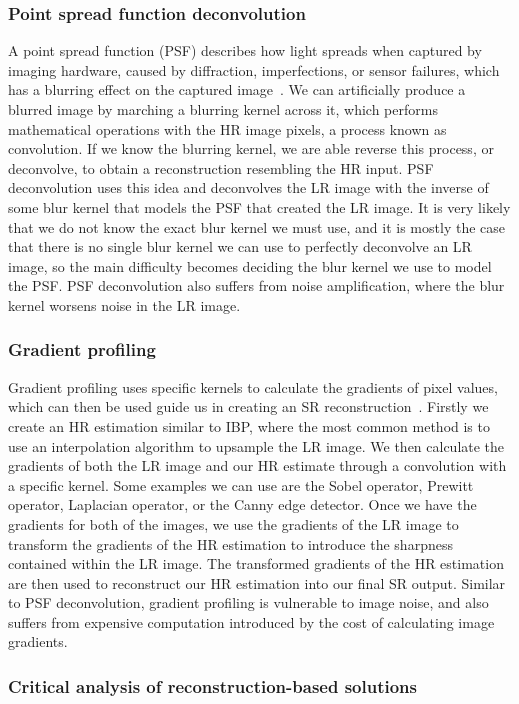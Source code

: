 \subsubsection{Point spread function deconvolution}
A point spread function (PSF) describes how light spreads when captured by imaging hardware, caused by diffraction, imperfections, or sensor failures, which has a blurring effect on the captured image~\cite{ref}. We can artificially produce a blurred image by marching a blurring kernel across it, which performs mathematical operations with the HR image pixels, a process known as convolution. If we know the blurring kernel, we are able reverse this process, or deconvolve, to obtain a reconstruction resembling the HR input. PSF deconvolution uses this idea and deconvolves the LR image with the inverse of some blur kernel that models the PSF that created the LR image. It is very likely that we do not know the exact blur kernel we must use, and it is mostly the case that there is no single blur kernel we can use to perfectly deconvolve an LR image, so the main difficulty becomes deciding the blur kernel we use to model the PSF. PSF deconvolution also suffers from noise amplification, where the blur kernel worsens noise in the LR image.

\subsubsection{Gradient profiling}
Gradient profiling uses specific kernels to calculate the gradients of pixel values, which can then be used guide us in creating an SR reconstruction~\cite{ref}. Firstly we create an HR estimation similar to IBP, where the most common method is to use an interpolation algorithm to upsample the LR image. We then calculate the gradients of both the LR image and our HR estimate through a convolution with a specific kernel. Some examples we can use are the Sobel operator, Prewitt operator, Laplacian operator, or the Canny edge detector. Once we have the gradients for both of the images, we use the gradients of the LR image to transform the gradients of the HR estimation to introduce the sharpness contained within the LR image. The transformed gradients of the HR estimation are then used to reconstruct our HR estimation into our final SR output. Similar to PSF deconvolution, gradient profiling is vulnerable to image noise, and also suffers from expensive computation introduced by the cost of calculating image gradients.

\subsubsection{Critical analysis of reconstruction-based solutions}

